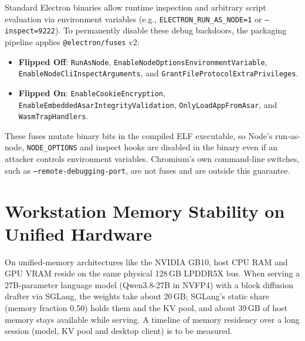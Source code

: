 \documentclass[11pt]{article}
\newcommand{\code}[1]{\texttt{#1}}
\begin{document}
Standard Electron binaries allow runtime inspection and arbitrary script evaluation via environment variables
(e.g., \code{ELECTRON\_RUN\_AS\_NODE=1} or \code{--inspect=9222}). To permanently disable these debug backdoors,
the packaging pipeline applies \code{@electron/fuses} v2:
\begin{itemize}
    \item \textbf{Flipped Off}:
    \code{RunAsNode},
    \code{EnableNodeOptions}\-\code{EnvironmentVariable},
    \code{EnableNodeCli}\-\code{InspectArguments}, and
    \code{GrantFileProtocol}\-\code{ExtraPrivileges}.
    \item \textbf{Flipped On}:
    \code{EnableCookieEncryption},
    \code{EnableEmbeddedAsar}\-\code{IntegrityValidation},
    \code{OnlyLoadAppFromAsar}, and
    \code{WasmTrapHandlers}.
\end{itemize}
These fuses mutate binary bits in the compiled ELF executable, so Node's run-as-node, \code{NODE\_OPTIONS} and inspect
hooks are disabled in the binary even if an attacker controls environment variables. Chromium's own command-line switches,
such as \code{--remote-debugging-port}, are not fuses and are outside this guarantee.

\section{Workstation Memory Stability on Unified Hardware}
\label{sec:memory-stability}

On unified-memory architectures like the NVIDIA GB10, host CPU RAM and GPU VRAM reside on the same physical
128\,GB LPDDR5X bus. When serving a 27B-parameter language model (Qwen3.8-27B in NVFP4) with a block diffusion drafter
via SGLang, the weights take about 20\,GB; SGLang's static share (memory fraction 0.50) holds them and the KV pool, and
about 39\,GB of host memory stays available while serving. A timeline of memory residency over a long session (model,
KV pool and desktop client) is to be measured.
\end{document}
